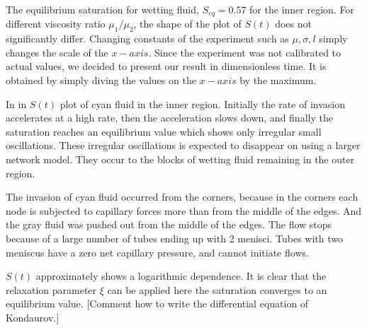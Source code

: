 \documentclass{crm-article}
\begin{document}
			The equilibrium saturation for wetting fluid, $S_{eq} = 0.57$ for the inner region. For different viscosity ratio ${\mu}_1 / {\mu_2}$, the shape of the plot of $S(t)$ does not significantly differ. Changing constants of the experiment such as $\mu, \sigma, l$ simply changes the scale of the $x-axis$. Since the experiment was not calibrated to actual values, we decided to present our result in dimensionless time. It is obtained by simply diving the values on the $x-axis$ by the maximum.
			
			In in $S(t)$ plot of cyan fluid in the inner region. Initially the rate of invasion accelerates at a high rate, then the acceleration slows down, and finally the saturation reaches an equilibrium value which shows only irregular small oscillations. These irregular oscillations is expected to disappear on using a larger network model. They occur to the blocks of wetting fluid remaining in the outer region.
			
			The invasion of cyan fluid occurred from the corners, because in the corners each node is subjected to capillary forces more than from the middle of the edges. And the gray fluid was pushed out from the middle of the edges. The flow stops because of a large number of tubes ending up with 2 menisci. Tubes with two meniscus have a zero net capillary pressure, and cannot initiate flows. 
			
			$S(t)$ approximately shows a logarithmic dependence. It is clear that the relaxation parameter $\xi$ can be applied here the saturation converges to an equilibrium value. [Comment how to write the differential equation of Kondaurov.]
\end{document}
